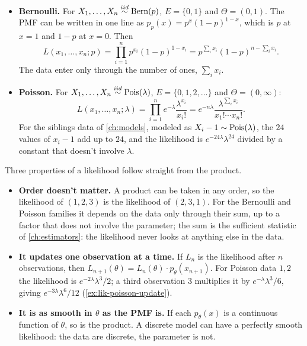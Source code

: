 \begin{worked}
\begin{itemize}
\item \textbf{Bernoulli.} For $X_1, \ldots, X_n \stackrel{iid}{\sim} \text{Bern}(p)$, $E = \{0, 1\}$ and $\Theta = (0, 1)$. The PMF can be written in one line as $p_p(x) = p^x (1 - p)^{1 - x}$, which is $p$ at $x = 1$ and $1 - p$ at $x = 0$. Then
\[
L(x_1, \ldots, x_n; p) = \prod_{i=1}^n p^{x_i}(1 - p)^{1 - x_i} = p^{\sum_i x_i}(1 - p)^{n - \sum_i x_i}.
\]
The data enter only through the number of ones, $\sum_i x_i$.
\item \textbf{Poisson.} For $X_1, \ldots, X_n \stackrel{iid}{\sim} \text{Pois}(\lambda)$, $E = \{0, 1, 2, \ldots\}$ and $\Theta = (0, \infty)$:
\[
L(x_1, \ldots, x_n; \lambda) = \prod_{i=1}^n e^{-\lambda}\frac{\lambda^{x_i}}{x_i!} = e^{-n\lambda}\frac{\lambda^{\sum_i x_i}}{x_1! \cdots x_n!}.
\]
For the siblings data of \cref{ch:models}, modeled as $X_i - 1 \sim \text{Pois}(\lambda)$, the $24$ values of $x_i - 1$ add up to $24$, and the likelihood is $e^{-24\lambda}\lambda^{24}$ divided by a constant that doesn't involve $\lambda$.
\end{itemize}
\end{worked}

Three properties of a likelihood follow straight from the product.

\begin{itemize}
\item \textbf{Order doesn't matter.} A product can be taken in any order, so the likelihood of $(1, 2, 3)$ is the likelihood of $(2, 3, 1)$. For the Bernoulli and Poisson families it depends on the data only through their sum, up to a factor that does not involve the parameter; the sum is the sufficient statistic of \cref{ch:estimators}: the likelihood never looks at anything else in the data.
\item \textbf{It updates one observation at a time.} If $L_n$ is the likelihood after $n$ observations, then $L_{n+1}(\theta) = L_n(\theta) \cdot p_\theta(x_{n+1})$. For Poisson data $1, 2$ the likelihood is $e^{-2\lambda}\lambda^3/2$; a third observation $3$ multiplies it by $e^{-\lambda}\lambda^3/6$, giving $e^{-3\lambda}\lambda^6/12$ (\cref{ex:lik-poisson-update}).
\item \textbf{It is as smooth in $\theta$ as the PMF is.} If each $p_\theta(x)$ is a continuous function of $\theta$, so is the product. A discrete model can have a perfectly smooth likelihood: the data are discrete, the parameter is not.
\end{itemize}

